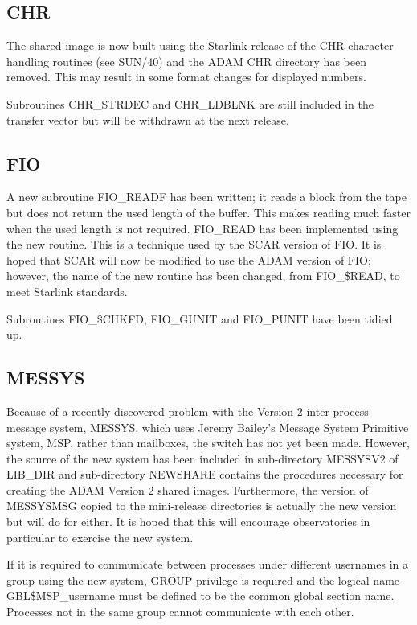 \subsection{CHR}
The shared image is now built using the Starlink release of the CHR character
handling routines (see SUN/40) and the ADAM CHR directory has been removed.
This may result in some format changes for displayed numbers.

Subroutines CHR\_STRDEC and CHR\_LDBLNK are still included in the transfer
vector but will be withdrawn at the next release.

\subsection{FIO}
\label{fio}
A new subroutine FIO\_READF has been written; it reads a block from the tape 
but does not return the used length of the buffer.
This makes reading much faster when the used length is not required.
FIO\_READ has been implemented using the new routine.
This is a technique used by the SCAR version of FIO.
It is hoped that SCAR will now be modified to use the ADAM version of FIO;
however, the name of the new routine has been changed, from FIO\_\$READ, to
meet Starlink standards.

Subroutines FIO\_\$CHKFD, FIO\_GUNIT and FIO\_PUNIT have been tidied up.

\subsection{MESSYS}
\label{messys}
Because of a recently discovered problem with the Version 2 inter-process 
message system, MESSYS, which uses Jeremy Bailey's Message System Primitive 
system, MSP, rather than mailboxes, the switch has not yet been made.
However, the source of the  new system has been included in sub-directory 
MESSYSV2 of LIB\_DIR and sub-directory NEWSHARE contains the procedures 
necessary for creating the ADAM Version 2 shared images.
Furthermore, the version of MESSYSMSG copied to the mini-release directories 
is actually the new version but will do for either.
It is hoped that this will encourage observatories in particular to exercise
the new system.

If it is required to communicate between processes under different usernames
in a group using the new system, GROUP privilege is required and the logical 
name GBL\$MSP\_username must be defined to be the common global section name.
Processes not in the same group cannot communicate with each other.

